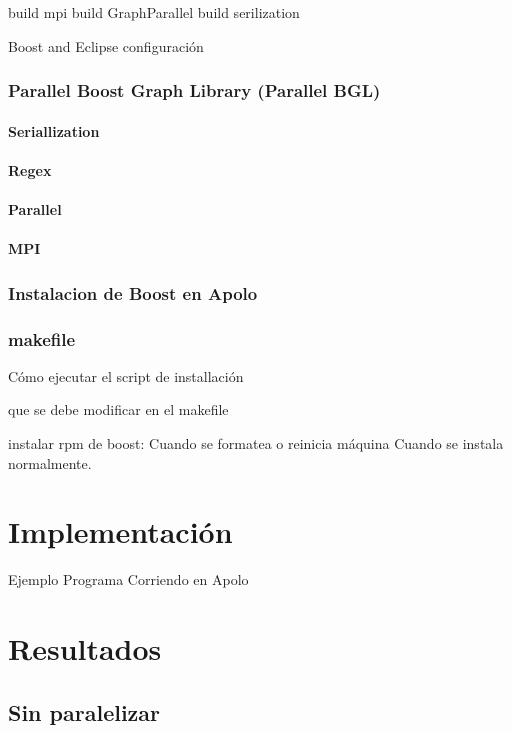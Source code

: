 \documentclass[twoside,letterpaper,12pt]{report}
\begin{document}
	build mpi
	build GraphParallel
	build serilization

Boost and Eclipse
	configuración
	
\subsection{Parallel Boost Graph Library (Parallel BGL) }
\subsubsection{Seriallization}
\subsubsection{Regex}
\subsubsection{Parallel}
\subsubsection{MPI}



\subsection{Instalacion de Boost en Apolo}


\subsection{makefile}

Cómo ejecutar el script de installación 

que se debe modificar en el makefile\cite{Wall2000}

instalar rpm de boost:
Cuando se formatea o reinicia máquina
Cuando se instala normalmente.



\chapter{Implementación}

Ejemplo Programa Corriendo en Apolo

\chapter{Resultados}

\section{Sin paralelizar}
\end{document}
